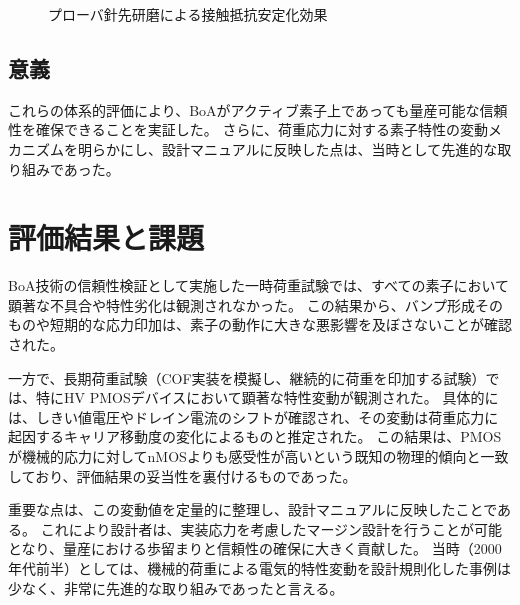 \documentclass[conference]{IEEEtran}
\begin{document}
\begin{figure}[t]
  \centering
  \caption{プローバ針先研磨による接触抵抗安定化効果}
\end{figure}

\subsection{意義}
これらの体系的評価により、BoAがアクティブ素子上であっても量産可能な信頼性を確保できることを実証した。  
さらに、荷重応力に対する素子特性の変動メカニズムを明らかにし、設計マニュアルに反映した点は、当時として先進的な取り組みであった。

\section{評価結果と課題}
BoA技術の信頼性検証として実施した一時荷重試験では、すべての素子において顕著な不具合や特性劣化は観測されなかった。  
この結果から、バンプ形成そのものや短期的な応力印加は、素子の動作に大きな悪影響を及ぼさないことが確認された。  

一方で、長期荷重試験（COF実装を模擬し、継続的に荷重を印加する試験）では、特にHV PMOSデバイスにおいて顕著な特性変動が観測された。  
具体的には、しきい値電圧やドレイン電流のシフトが確認され、その変動は荷重応力に起因するキャリア移動度の変化によるものと推定された。  
この結果は、PMOSが機械的応力に対してnMOSよりも感受性が高いという既知の物理的傾向と一致しており、評価結果の妥当性を裏付けるものであった。  

重要な点は、この変動値を定量的に整理し、設計マニュアルに反映したことである。  
これにより設計者は、実装応力を考慮したマージン設計を行うことが可能となり、量産における歩留まりと信頼性の確保に大きく貢献した。  
当時（2000年代前半）としては、機械的荷重による電気的特性変動を設計規則化した事例は少なく、非常に先進的な取り組みであったと言える。  
\end{document}
